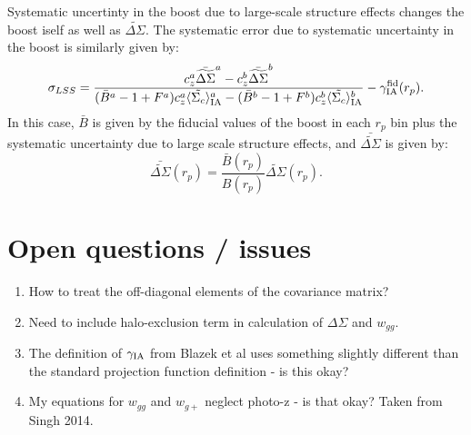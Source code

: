 \documentclass[onecolumn,amsmath,aps,fleqn, superscriptaddress]{revtex4}
\begin{document}
Systematic uncertinty in the boost due to large-scale structure effects changes the boost iself as well as $\widetilde{\Delta\Sigma}$. The systematic error due to systematic uncertainty in the boost is similarly given by: 
\begin{equation}
\sigma_{LSS} = \frac{c_z^a \bar{\widetilde{\Delta\Sigma}}^a - c_z^b \bar{\widetilde{\Delta\Sigma}}^b}{(\bar{B}^a-1+F^a)c_z^a \langle \tilde{\Sigma_c}\rangle_{\rm IA}^a -(\bar{B}^b -1+F^b)c_z^b \langle \tilde{\Sigma_c}\rangle_{\rm IA}^b}- \gamma_{\rm IA}^{\rm fid}(r_p).
\label{sigmaBsys}
\end{equation}
In this case, $\bar{B}$ is given by the fiducial values of the boost in each $r_p$ bin plus the systematic uncertainty due to large scale structure effects, and $\bar{\widetilde{\Delta\Sigma}}$ is given by:
\begin{equation}
\bar{\widetilde{\Delta\Sigma}}(r_p) = \frac{\bar{B}(r_p)}{B(r_p)} \widetilde{\Delta\Sigma}(r_p).
\label{barDS}
\end{equation}


\section{Open questions / issues}
\begin{enumerate}
\item{How to treat the off-diagonal elements of the covariance matrix?}
\item{Need to include halo-exclusion term in calculation of $\Delta \Sigma$ and $w_{gg}$.}
\item{The definition of $\gamma_{\rm IA}$ from Blazek et al uses something slightly different than the standard projection function definition - is this okay?}
\item{My equations for $w_{gg}$ and $w_{g+}$ neglect photo-z - is that okay? Taken from Singh 2014.}
\end{enumerate}











\end{document}
